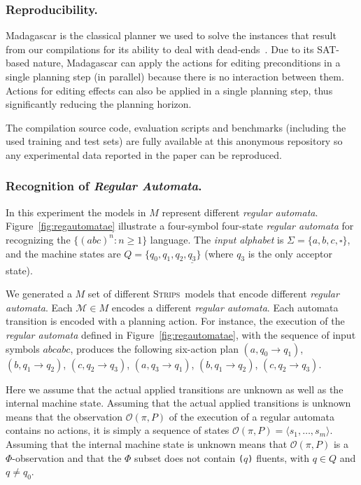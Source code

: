 \documentclass[letterpaper]{article} %
\newcommand{\tup}[1]{{\langle #1 \rangle}}
\newcommand{\strips}{\textsc{Strips}}     %
\begin{document}
\subsubsection{Reproducibility.} {\sc Madagascar} is the classical planner we used to solve the instances that result from our compilations for its ability to deal with dead-ends~\cite{rintanen2014madagascar}. Due to its SAT-based nature, {\sc Madagascar} can apply the actions for editing preconditions in a single planning step (in parallel) because there is no interaction between them. Actions for editing effects can also be applied in a single planning step, thus significantly reducing the planning horizon.

The compilation source code, evaluation scripts and benchmarks (including the used training and test sets) are fully available at this anonymous repository {\em } so any experimental data reported in the paper can be reproduced.

\subsubsection{Recognition of {\em Regular Automata}.} In this experiment the models in $M$ represent different {\em regular automata}. Figure~\ref{fig:regautomatae} illustrate a four-symbol four-state {\em regular automata} for recognizing the $\{(abc)^n : n \geq 1 \}$ language. The {\em input alphabet} is $\Sigma=\{a,b,c,\square\}$, and the machine states are $Q=\{q_0,q_1,q_2,\underline{q_3}\}$ (where \underline{$q_3$} is the only acceptor state).

We generated a $M$ set of different \strips\ models that encode different {\em regular automata}. Each $\mathcal{M}\in M$ encodes a different {\em regular automata}. Each automata transition is encoded with a planning action. For instance, the execution of the {\em regular automata} defined in Figure~\ref{fig:regautomatae}, with the sequence of input symbols $abcabc$, produces the following six-action plan {\small $(a,q_0\rightarrow q_1)$, $(b,q_1\rightarrow q_2)$, $(c,q_2\rightarrow q_3)$, $(a,q_3\rightarrow q_1)$, $(b,q_1\rightarrow q_2)$, $(c,q_2\rightarrow q_3)$}.

Here we assume that the actual applied transitions are unknown as well as the internal machine state. Assuming that the actual applied transitions is unknown means that the observation $\mathcal{O}(\pi,P)$ of the execution of a regular automata contains no actions, it is simply a sequence of states $\mathcal{O}(\pi,P)=\tup{s_1, \ldots , s_m}$. Assuming that the internal machine state is unknown means that $\mathcal{O}(\pi,P)$ is a $\Phi$-observation and that the $\Phi$ subset does not contain {\small\tt ($q$)} fluents, with $q\in Q$ and $q\neq q_0$.
\end{document}
